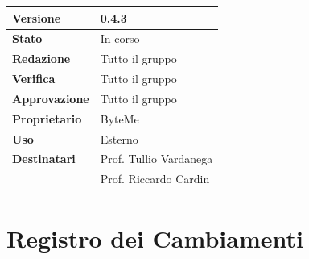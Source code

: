 \documentclass[11pt,a4paper]{article}
\begin{document}
\begin{titlepage}
    \begin{table}[H]
        \centering
        \begin{tabular}{|l|p{5cm}|}
            \hline
            \textbf{Versione} & 0.4.3 \\
            \hline
            \textbf{Stato} & In corso \\
            \hline
            \textbf{Redazione} & Tutto il gruppo \\
            \hline
            \textbf{Verifica} & Tutto il gruppo \\
            \hline
            \textbf{Approvazione} & Tutto il gruppo \\
            \hline
            \textbf{Proprietario} & ByteMe \\
            \hline
            \textbf{Uso} & Esterno \\
            \hline
            \textbf{Destinatari} & Prof. Tullio Vardanega \\ & Prof. Riccardo Cardin \\
            \hline
        \end{tabular}
    \end{table}
    
    \vfill
\end{titlepage}

\thispagestyle{empty}
\section*{Registro dei Cambiamenti}
\end{document}
